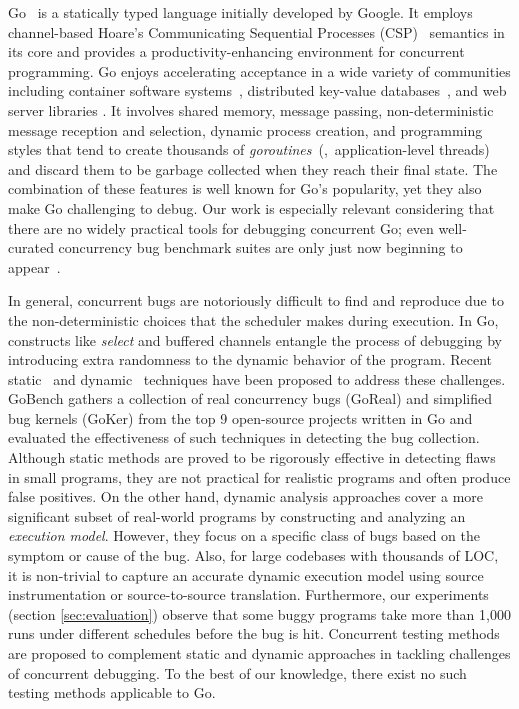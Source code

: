 Go~\cite{go} is a statically typed language initially developed by Google.
%
It employs channel-based Hoare's Communicating Sequential Processes (CSP)~\cite{hoare-csp78} semantics in its core and provides a productivity-enhancing environment for concurrent programming.
%
Go enjoys accelerating acceptance in a wide variety of
communities including container software systems~\cite{merkel2014docker,kubernetes},  distributed key-value databases~\cite{etcd,cockroachdb-sigmod20}, and web server libraries \cite{grpc}.
%
It involves shared memory, message passing, non-deterministic message reception and selection, dynamic process creation, and programming styles that tend to create thousands of \textit{goroutines}~(\ie,~application-level threads) and discard them to be garbage collected when they reach their final state.
%
The combination of these features is well known for Go's popularity, yet they also make Go challenging to debug.
%
Our work is especially relevant considering that there are no widely practical tools for debugging concurrent Go; even well-curated
concurrency bug benchmark suites are only just now beginning to appear~\cite{tu-concurrentBugs-asplos19,yuan-gobench-cgo21}.
%

In general, concurrent bugs are notoriously difficult to find and reproduce due to the non-deterministic choices that the scheduler makes during execution.
%
In Go, constructs like \textit{select} and buffered channels entangle the process of debugging by introducing extra randomness to the dynamic behavior of the program.
%
Recent static~\cite{ng-dl-cc16,stadtmuller-minigo-aplas16,lange-fence-popl17,lange-staticType-icse18} and dynamic~\cite{go-race-blog,zhao-occam97,sulzmann-corr17,sulzmann-twophase-2018,dilley-gomela-corr2020} techniques have been proposed to address these challenges.
%
GoBench \cite{yuan-gobench-cgo21} gathers a collection of real concurrency bugs (GoReal) and simplified bug kernels (GoKer) from the top 9 open-source projects written in Go and evaluated the effectiveness of such techniques in detecting the bug collection.
%
Although static methods are proved to be rigorously effective in detecting flaws in small programs, they are not practical for realistic programs and often produce false positives.
%
On the other hand, dynamic analysis approaches cover a more significant subset of real-world programs by constructing and analyzing an \textit{execution model}.
%
However, they focus on a specific class of bugs based on the symptom or cause of the bug.
%
Also, for large codebases with thousands of LOC, it is non-trivial to capture an accurate dynamic execution model using source instrumentation or source-to-source translation.
%
Furthermore, our experiments (section \ref{sec:evaluation}) observe that some buggy programs take more than 1,000 runs under different schedules before the bug is hit.
%
Concurrent testing methods~\cite{arora-concrrentTesting-16} are proposed to complement static and dynamic approaches in tackling challenges of concurrent debugging.
%
To the best of our knowledge, there exist no such testing methods applicable to Go.
%

